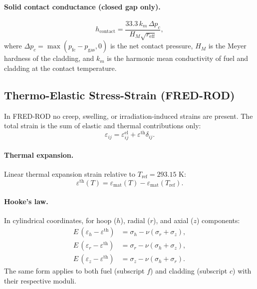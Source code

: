 \documentclass[11pt,a4paper]{article}
\begin{document}
\paragraph{Solid contact conductance (closed gap only).}
\begin{equation}
  h_{\mathrm{contact}} = \frac{33.3 \, k_m \, \Delta p_c}{H_M \sqrt{r_{\mathrm{eff}}}},
\end{equation}
where $\Delta p_c = \max(p_{\mathrm{fc}} - p_{\mathrm{gas}}, 0)$ is the net
contact pressure, $H_M$ is the Meyer hardness of the cladding, and $k_m$ is
the harmonic mean conductivity of fuel and cladding at the contact temperature.

\subsection{Thermo-Elastic Stress-Strain (FRED-ROD)}

In FRED-ROD no creep, swelling, or irradiation-induced strains are present.
The total strain is the sum of elastic and thermal contributions only:
\begin{equation}
  \varepsilon_{ij} = \varepsilon^{\mathrm{el}}_{ij} + \varepsilon^{\mathrm{th}} \delta_{ij}.
\end{equation}

\paragraph{Thermal expansion.}
Linear thermal expansion strain relative to $T_{\mathrm{ref}} = 293.15$ K:
\begin{equation}
  \varepsilon^{\mathrm{th}}(T) = \varepsilon_{\mathrm{mat}}(T) - \varepsilon_{\mathrm{mat}}(T_{\mathrm{ref}}).
\end{equation}

\paragraph{Hooke's law.}  In cylindrical coordinates, for hoop ($h$), radial
($r$), and axial ($z$) components:
\begin{align}
  E \, (\varepsilon_h - \varepsilon^{\mathrm{th}}) &= \sigma_h - \nu(\sigma_r + \sigma_z),\\
  E \, (\varepsilon_r - \varepsilon^{\mathrm{th}}) &= \sigma_r - \nu(\sigma_h + \sigma_z),\\
  E \, (\varepsilon_z - \varepsilon^{\mathrm{th}}) &= \sigma_z - \nu(\sigma_h + \sigma_r).
\end{align}
The same form applies to both fuel (subscript $f$) and cladding (subscript $c$)
with their respective moduli.
\end{document}

